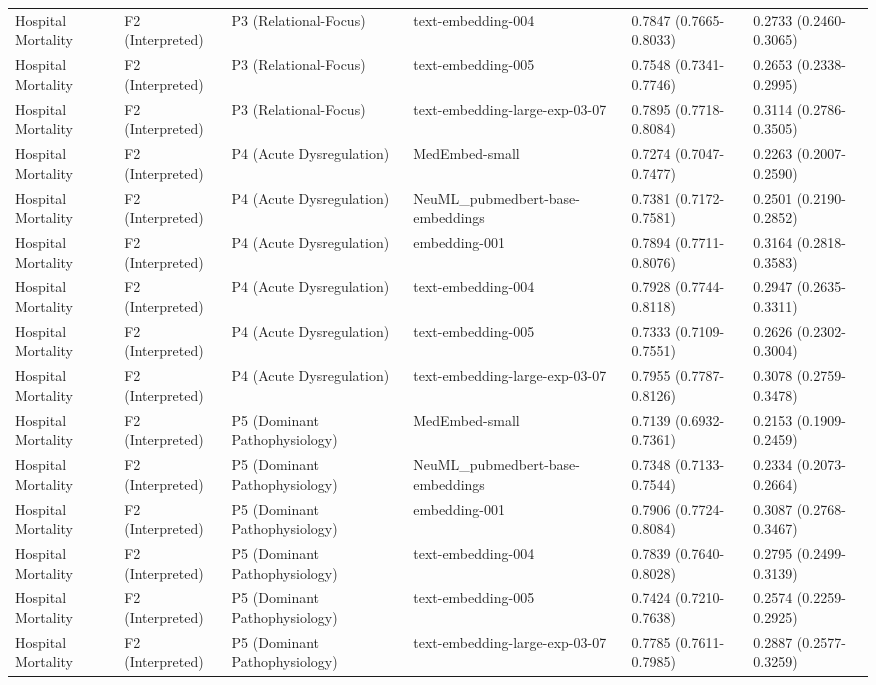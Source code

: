 \begin{tabular}{llllll}
Hospital Mortality & F2 (Interpreted) & P3 (Relational-Focus) & text-embedding-004 & 0.7847 (0.7665-0.8033) & 0.2733 (0.2460-0.3065) \\
Hospital Mortality & F2 (Interpreted) & P3 (Relational-Focus) & text-embedding-005 & 0.7548 (0.7341-0.7746) & 0.2653 (0.2338-0.2995) \\
Hospital Mortality & F2 (Interpreted) & P3 (Relational-Focus) & text-embedding-large-exp-03-07 & 0.7895 (0.7718-0.8084) & 0.3114 (0.2786-0.3505) \\
Hospital Mortality & F2 (Interpreted) & P4 (Acute Dysregulation) & MedEmbed-small & 0.7274 (0.7047-0.7477) & 0.2263 (0.2007-0.2590) \\
Hospital Mortality & F2 (Interpreted) & P4 (Acute Dysregulation) & NeuML\_pubmedbert-base-embeddings & 0.7381 (0.7172-0.7581) & 0.2501 (0.2190-0.2852) \\
Hospital Mortality & F2 (Interpreted) & P4 (Acute Dysregulation) & embedding-001 & 0.7894 (0.7711-0.8076) & 0.3164 (0.2818-0.3583) \\
Hospital Mortality & F2 (Interpreted) & P4 (Acute Dysregulation) & text-embedding-004 & 0.7928 (0.7744-0.8118) & 0.2947 (0.2635-0.3311) \\
Hospital Mortality & F2 (Interpreted) & P4 (Acute Dysregulation) & text-embedding-005 & 0.7333 (0.7109-0.7551) & 0.2626 (0.2302-0.3004) \\
Hospital Mortality & F2 (Interpreted) & P4 (Acute Dysregulation) & text-embedding-large-exp-03-07 & 0.7955 (0.7787-0.8126) & 0.3078 (0.2759-0.3478) \\
Hospital Mortality & F2 (Interpreted) & P5 (Dominant Pathophysiology) & MedEmbed-small & 0.7139 (0.6932-0.7361) & 0.2153 (0.1909-0.2459) \\
Hospital Mortality & F2 (Interpreted) & P5 (Dominant Pathophysiology) & NeuML\_pubmedbert-base-embeddings & 0.7348 (0.7133-0.7544) & 0.2334 (0.2073-0.2664) \\
Hospital Mortality & F2 (Interpreted) & P5 (Dominant Pathophysiology) & embedding-001 & 0.7906 (0.7724-0.8084) & 0.3087 (0.2768-0.3467) \\
Hospital Mortality & F2 (Interpreted) & P5 (Dominant Pathophysiology) & text-embedding-004 & 0.7839 (0.7640-0.8028) & 0.2795 (0.2499-0.3139) \\
Hospital Mortality & F2 (Interpreted) & P5 (Dominant Pathophysiology) & text-embedding-005 & 0.7424 (0.7210-0.7638) & 0.2574 (0.2259-0.2925) \\
Hospital Mortality & F2 (Interpreted) & P5 (Dominant Pathophysiology) & text-embedding-large-exp-03-07 & 0.7785 (0.7611-0.7985) & 0.2887 (0.2577-0.3259) \\

\end{tabular}
